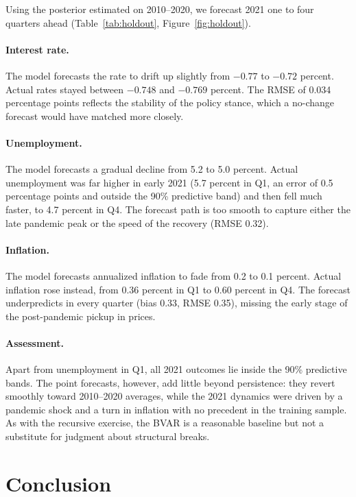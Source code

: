 \documentclass[11pt]{article}
\begin{document}
Using the posterior estimated on 2010--2020, we forecast 2021 one to four quarters ahead (Table~\ref{tab:holdout}, Figure~\ref{fig:holdout}).

\paragraph{Interest rate.} The model forecasts the rate to drift up slightly from $-0.77$ to $-0.72$ percent. Actual rates stayed between $-0.748$ and $-0.769$ percent. The RMSE of 0.034 percentage points reflects the stability of the policy stance, which a no-change forecast would have matched more closely.

\paragraph{Unemployment.} The model forecasts a gradual decline from 5.2 to 5.0 percent. Actual unemployment was far higher in early 2021 (5.7 percent in Q1, an error of 0.5 percentage points and outside the 90\% predictive band) and then fell much faster, to 4.7 percent in Q4. The forecast path is too smooth to capture either the late pandemic peak or the speed of the recovery (RMSE 0.32).

\paragraph{Inflation.} The model forecasts annualized inflation to fade from 0.2 to 0.1 percent. Actual inflation rose instead, from 0.36 percent in Q1 to 0.60 percent in Q4. The forecast underpredicts in every quarter (bias 0.33, RMSE 0.35), missing the early stage of the post-pandemic pickup in prices.

\paragraph{Assessment.} Apart from unemployment in Q1, all 2021 outcomes lie inside the 90\% predictive bands. The point forecasts, however, add little beyond persistence: they revert smoothly toward 2010--2020 averages, while the 2021 dynamics were driven by a pandemic shock and a turn in inflation with no precedent in the training sample. As with the recursive exercise, the BVAR is a reasonable baseline but not a substitute for judgment about structural breaks.

\section{Conclusion}
\label{sec:conclusion}
\end{document}
